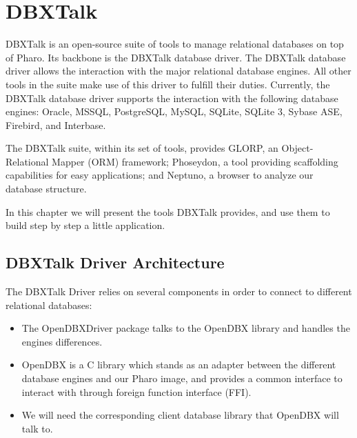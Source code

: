 \documentclass[a4paper,10pt,twoside]{book}
\begin{document}
\fi
\sloppy


\chapter{DBXTalk}
\chapterauthor{\authorguille{}}

DBXTalk is an open-source suite of tools to manage relational databases on top of Pharo. Its backbone is the DBXTalk database driver. The DBXTalk database driver allows the interaction with the major relational database engines. All other tools in the suite make use of this driver to fulfill their duties.  Currently, the DBXTalk database driver supports the interaction with the following database engines: Oracle, MSSQL, PostgreSQL, MySQL, SQLite, SQLite 3, Sybase ASE, Firebird, and Interbase.

The DBXTalk suite, within its set of tools, provides GLORP, an Object-Relational Mapper (ORM) framework; Phoseydon, a tool providing scaffolding capabilities for easy applications; and Neptuno, a browser to analyze our database structure. 

In this chapter we will present the tools DBXTalk provides, and use them to build step by step a little application.

\section{DBXTalk Driver Architecture}
The DBXTalk Driver relies on several components in order to connect to different relational databases:
\begin{itemize}
\item The OpenDBXDriver package talks to the OpenDBX library and handles the engines differences.
\item OpenDBX is a C library which stands as an adapter between the different database engines 
and our Pharo image, and provides a common interface to interact with through foreign function interface (FFI).
\item We will need the corresponding client database library that OpenDBX will talk to.
\end{itemize}
\end{document}
